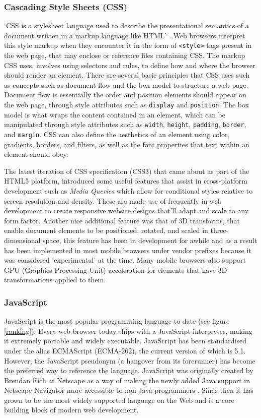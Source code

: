 \documentclass[final]{cmpreport}
\begin{document}
\subsubsection{Cascading Style Sheets (CSS)}
`CSS is a stylesheet language used to describe the presentational semantics of a document written in a markup language like HTML' \citep{Neilson}. Web browsers interpret this style markup when they encounter it in the form of \texttt{<style>} tags present in the web page, that may enclose or reference files containing CSS. The markup CSS uses, involves using selectors and rules, to define how and where the browser should render an element. There are several basic principles that CSS uses such as concepts such as document flow and the box model to structure a web page. Document flow is essentially the order and position elements should appear on the web page, through style attributes such as \texttt{display} and \texttt{position}. The box model is what wraps the content contained in an element, which can be manipulated through style attributes such as \texttt{width}, \texttt{height}, \texttt{padding}, \texttt{border}, and \texttt{margin}. CSS can also define the aesthetics of an element using color, gradients, borders, and filters, as well as the font properties that text within an element should obey.

The latest iteration of CSS specification (CSS3) that came about as part of the HTML5 platform, introduced some useful features that assist in cross-platform development such as \textit{Media Queries} which allow for conditional styles relative to screen resolution and density. These are made use of frequently in web development to create responsive website designs that'll adapt and scale to any form factor. Another nice additional feature was that of 3D transforms, that enable document elements to be positioned, rotated, and scaled in three-dimensional space, this feature has been in development for awhile and as a result has been implemented in most mobile browsers under vendor prefixes because it was considered `experimental' at the time. Many mobile browsers also support GPU (Graphics Processing Unit) acceleration for elements that have 3D transformations applied to them.

\subsubsection{JavaScript}
JavaScript is the most popular programming language to date (see figure \ref{ranking}). Every web browser today ships with a JavaScript interpreter, making it extremely portable and widely executable. JavaScript has been standardised under the alias ECMAScript (ECMA-262), the current version of which is 5.1\footnotemark. However, the JavaScript pseudonym (a hangover from its forerunner) has become the preferred way to reference the language. JavaScript was originally created by Brendan Eich at Netscape as a way of making the newly added Java support in Netscape Navigator more accessible to non-Java programmers \citep{Champeon}. Since then it has grown to be the most widely supported  language on the Web and is a core building block of modern web development.
\end{document}
